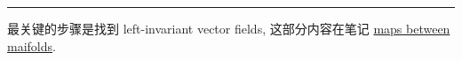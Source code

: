 \begin{itemize}
\begin{tcolorbox}[title=proof:]
		\noindent\rule[0.5ex]{\linewidth}{0.5pt} %
		
		最关键的步骤是找到 left-invariant vector fields, 这部分内容在笔记 \href{https://github.com/siyang03/my-note---maps-between-manifolds}{maps between maifolds}.
	\end{tcolorbox}
\end{itemize}
